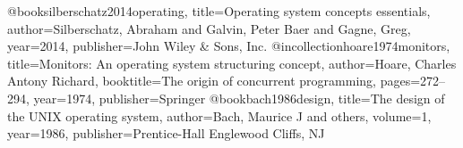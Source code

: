 @book{silberschatz2014operating,
  title={Operating system concepts essentials},
  author={Silberschatz, Abraham and Galvin, Peter Baer and Gagne, Greg},
  year={2014},
  publisher={John Wiley \& Sons, Inc.}
}
@incollection{hoare1974monitors,
  title={Monitors: An operating system structuring concept},
  author={Hoare, Charles Antony Richard},
  booktitle={The origin of concurrent programming},
  pages={272--294},
  year={1974},
  publisher={Springer}
}
@book{bach1986design,
  title={The design of the UNIX operating system},
  author={Bach, Maurice J and others},
  volume={1},
  year={1986},
  publisher={Prentice-Hall Englewood Cliffs, NJ}
}